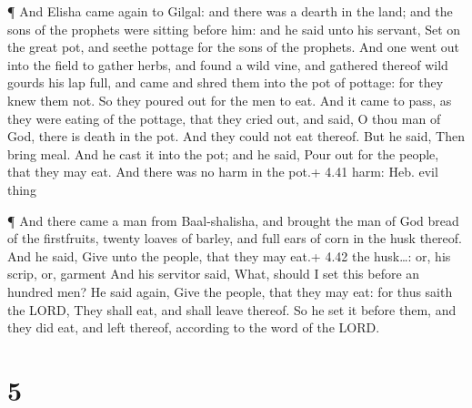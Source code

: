  ¶ And Elisha came again to Gilgal: and there was a dearth
in the land; and the sons of the prophets were sitting before him: and
he said unto his servant, Set on the great pot, and seethe pottage for
the sons of the prophets.  And one went out into the field
to gather herbs, and found a wild vine, and gathered thereof wild gourds
his lap full, and came and shred them into the pot of pottage: for they
knew them not.  So they poured out for the men to eat. And
it came to pass, as they were eating of the pottage, that they cried
out, and said, O thou man of God, there is death in the pot. And they
could not eat thereof.  But he said, Then bring meal. And
he cast it into the pot; and he said, Pour out for the people, that they
may eat. And there was no harm in the pot.+ 4.41 harm: Heb. evil thing

 ¶ And there came a man from Baal-shalisha, and brought the
man of God bread of the firstfruits, twenty loaves of barley, and full
ears of corn in the husk thereof. And he said, Give unto the people,
that they may eat.+ 4.42 the husk\ldots: or, his scrip, or, garment
 And his servitor said, What, should I set this before an
hundred men? He said again, Give the people, that they may eat: for thus
saith the LORD, They shall eat, and shall leave thereof. 
So he set it before them, and they did eat, and left thereof, according
to the word of the LORD.

\hypertarget{section-4}{%
\section{5}\label{section-4}}

